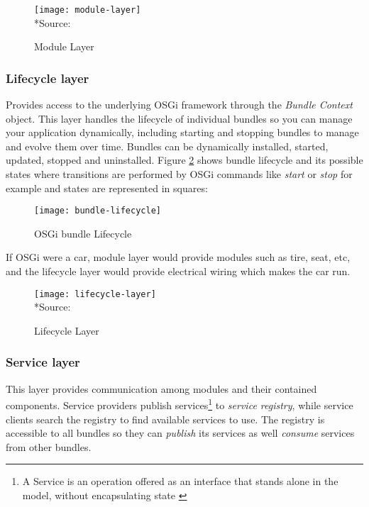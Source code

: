 \begin{figure}[h]
\label{module layer}
\caption{Module Layer}
\centering
\texttt{[image: module-layer]}
\\*Source: \cite{conceptual layers 2011}
\end{figure}
\FloatBarrier

\subsubsection{Lifecycle layer}
Provides access to the underlying OSGi framework through the \emph{Bundle Context} object. This layer handles the lifecycle of individual bundles so you can manage your application dynamically, including starting and stopping bundles to manage and evolve them over time. Bundles can be dynamically installed, started, updated, stopped and uninstalled. Figure \ref{bundle lifecycle} shows bundle lifecycle and its possible states where transitions are performed by OSGi commands like \emph{start} or \emph{stop} for example and states are represented in squares:

\begin{figure}[h]
\label{bundle lifecycle}
\caption{OSGi bundle Lifecycle}
\centering
\texttt{[image: bundle-lifecycle]}
\end{figure}
\FloatBarrier

If OSGi were a car, module layer would provide modules such as tire, seat, etc, and the lifecycle layer would provide electrical wiring which makes the car run. 

\begin{figure}[h]
\label{lifecycle layer}
\caption{Lifecycle Layer}
\centering
\texttt{[image: lifecycle-layer]}
\\*Source: \cite{conceptual layers 2011}
\end{figure}
\FloatBarrier

\subsubsection{Service layer}
This layer provides communication among modules and their contained components. Service providers publish services\footnote{A Service is an operation offered as an interface that stands alone in the model, without encapsulating state \citep{Evans 2003}} to \emph{service registry}, while service clients search the registry to find available services to use. The registry is accessible to all bundles so they can \emph{publish} its services as well \emph{consume} services from other bundles.  

